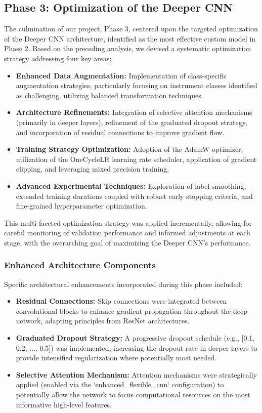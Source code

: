 \subsection{Phase 3: Optimization of the Deeper CNN}
The culmination of our project, Phase 3, centered upon the targeted optimization of the Deeper CNN architecture, identified as the most effective custom model in Phase 2. Based on the preceding analysis, we devised a systematic optimization strategy addressing four key areas:
\begin{itemize}
    \item \textbf{Enhanced Data Augmentation:} Implementation of class-specific augmentation strategies, particularly focusing on instrument classes identified as challenging, utilizing balanced transformation techniques.
    \item \textbf{Architecture Refinements:} Integration of selective attention mechanisms (primarily in deeper layers), refinement of the graduated dropout strategy, and incorporation of residual connections to improve gradient flow.
    \item \textbf{Training Strategy Optimization:} Adoption of the AdamW optimizer, utilization of the OneCycleLR learning rate scheduler, application of gradient clipping, and leveraging mixed precision training.
    \item \textbf{Advanced Experimental Techniques:} Exploration of label smoothing, extended training durations coupled with robust early stopping criteria, and fine-grained hyperparameter optimization.
\end{itemize}
This multi-faceted optimization strategy was applied incrementally, allowing for careful monitoring of validation performance and informed adjustments at each stage, with the overarching goal of maximizing the Deeper CNN's performance.

\subsubsection{Enhanced Architecture Components}
Specific architectural enhancements incorporated during this phase included:
\begin{itemize}
    \item \textbf{Residual Connections:} Skip connections were integrated between convolutional blocks to enhance gradient propagation throughout the deep network, adapting principles from ResNet architectures.
    \item \textbf{Graduated Dropout Strategy:} A progressive dropout schedule (e.g., [0.1, 0.2, ..., 0.5]) was implemented, increasing the dropout rate in deeper layers to provide intensified regularization where potentially most needed.
    \item \textbf{Selective Attention Mechanism:} Attention mechanisms were strategically applied (enabled via the `enhanced_flexible_cnn` configuration) to potentially allow the network to focus computational resources on the most informative high-level features.
\end{itemize}


